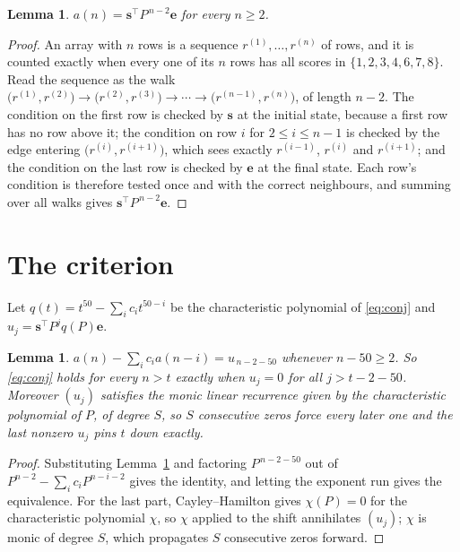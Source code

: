 \documentclass[11pt,a4paper]{article}
\theoremstyle{plain}
\newtheorem{lemma}[theorem]{Lemma}
\theoremstyle{definition}
\begin{document}
\begin{lemma}\label{lem:walk}
$a(n)=\mathbf{s}^{\!\top}P^{\,n-2}\mathbf{e}$ for every $n\ge2$.
\end{lemma}

\begin{proof}
An array with $n$ rows is a sequence $r^{(1)},\dots,r^{(n)}$ of rows, and it is counted
exactly when every one of its $n$ rows has all scores in $\{1,2,3,4,6,7,8\}$. Read the sequence as the
walk $\bigl(r^{(1)},r^{(2)}\bigr)\to\bigl(r^{(2)},r^{(3)}\bigr)\to\cdots\to
\bigl(r^{(n-1)},r^{(n)}\bigr)$, of length $n-2$. The condition on the first row is
checked by $\mathbf{s}$ at the initial state, because a first row has no row above it; the
condition on row $i$ for $2\le i\le n-1$ is checked by the edge entering
$\bigl(r^{(i)},r^{(i+1)}\bigr)$, which sees exactly $r^{(i-1)}$, $r^{(i)}$ and
$r^{(i+1)}$; and the condition on the last row is checked by $\mathbf{e}$ at the final
state. Each row's condition is therefore tested once and with the correct neighbours, and
summing over all walks gives $\mathbf{s}^{\!\top}P^{\,n-2}\mathbf{e}$.
\end{proof}

\section{The criterion}

Let $q(t)=t^{50}-\sum_i c_i t^{50-i}$ be the characteristic polynomial of
\eqref{eq:conj} and $u_j=\mathbf{s}^{\!\top}P^{j}q(P)\mathbf{e}$.

\begin{lemma}\label{lem:crit}
$a(n)-\sum_i c_i a(n-i)=u_{\,n-2-50}$ whenever $n-50\ge2$. So \eqref{eq:conj}
holds for every $n>t$ exactly when $u_j=0$ for all $j>t-2-50$. Moreover $(u_j)$
satisfies the monic linear recurrence given by the characteristic polynomial of $P$, of
degree $S$, so $S$ consecutive zeros force every later one and the last nonzero $u_j$ pins
$t$ down exactly.
\end{lemma}

\begin{proof}
Substituting Lemma~\ref{lem:walk} and factoring $P^{\,n-2-50}$ out of
$P^{n-2}-\sum_i c_i P^{n-i-2}$ gives the identity, and letting the exponent run gives the
equivalence. For the last part, Cayley--Hamilton gives $\chi(P)=0$ for the characteristic
polynomial $\chi$, so $\chi$ applied to the shift annihilates $(u_j)$; $\chi$ is monic of
degree $S$, which propagates $S$ consecutive zeros forward.
\end{proof}
\end{document}
